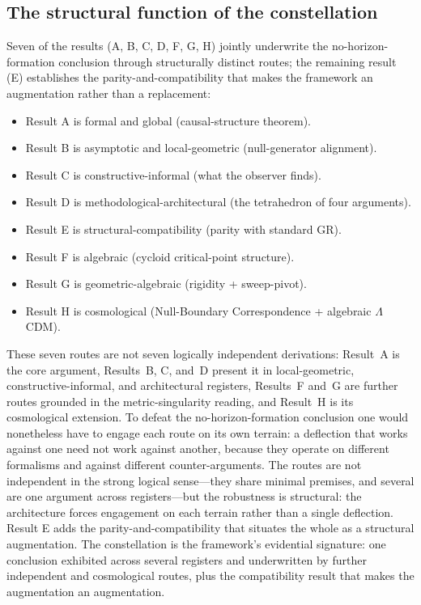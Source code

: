 \documentclass[11pt,a4paper]{article}
\theoremstyle{definition}
\begin{document}
\subsection{The structural function of the constellation}\label{sec:constellation-function}

Seven of the results (A, B, C, D, F, G, H) jointly underwrite the no-horizon-formation conclusion through structurally distinct routes; the remaining result (E) establishes the parity-and-compatibility that makes the framework an augmentation rather than a replacement:

\begin{itemize}
\item Result A is formal and global (causal-structure theorem).
\item Result B is asymptotic and local-geometric (null-generator alignment).
\item Result C is constructive-informal (what the observer finds).
\item Result D is methodological-architectural (the tetrahedron of four arguments).
\item Result E is structural-compatibility (parity with standard GR).
\item Result F is algebraic (cycloid critical-point structure).
\item Result G is geometric-algebraic (rigidity + sweep-pivot).
\item Result H is cosmological (Null-Boundary Correspondence + algebraic $\Lambda$CDM).
\end{itemize}

These seven routes are not seven logically independent derivations: Result~A is the core argument, Results~B, C, and~D present it in local-geometric, constructive-informal, and architectural registers, Results~F and~G are further routes grounded in the metric-singularity reading, and Result~H is its cosmological extension. To defeat the no-horizon-formation conclusion one would nonetheless have to engage each route on its own terrain: a deflection that works against one need not work against another, because they operate on different formalisms and against different counter-arguments. The routes are not independent in the strong logical sense---they share minimal premises, and several are one argument across registers---but the robustness is structural: the architecture forces engagement on each terrain rather than a single deflection. Result E adds the parity-and-compatibility that situates the whole as a structural augmentation. The constellation is the framework's evidential signature: one conclusion exhibited across several registers and underwritten by further independent and cosmological routes, plus the compatibility result that makes the augmentation an augmentation.
\end{document}
